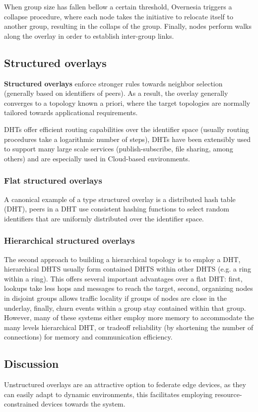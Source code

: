 When group size has fallen bellow a certain threshold, Overnesia triggers a collapse procedure, where each node takes the initiative to relocate itself to another group, resulting in the collaps of the group. Finally, nodes perform walks along the overlay in order to establish inter-group links.


\subsection{Structured overlays} 

\textbf{Structured overlays} enforce stronger rules towards neighbor selection (generally based on identifiers of peers). As a result, the overlay generally converges to a topology known a priori, where the target topologies are normally tailored towards applicational requirements. 

DHTs offer efficient routing capabilities over the identifier space (usually routing procedures take a logarithmic number of steps), DHTs have been extensibly used to support many large scale services (publish-subscribe, file sharing, among others) and are especially used in Cloud-based environments. 

\subsubsection{Flat structured overlays}

A canonical example of a type structured overlay is a distributed hash table (DHT), peers in a DHT use consistent hashing functions to select random identifiers that are uniformly distributed over the identifier space. 

\subsubsection{Hierarchical structured overlays}

The second approach to building a hierarchical topology is to employ a DHT, hierarchical DHTS usually form contained DHTS within other DHTS (e.g. a ring within a ring). This offers several important advantages over a flat DHT: first, lookups take less hops and messages to reach the target, second, organizing nodes in disjoint groups allows traffic locality if groups of nodes are close in the underlay, finally, churn events within a group stay contained within that group. However, many of these systems either employ more memory to accommodate the many levels hierarchical DHT, or tradeoff reliability (by shortening the number of connections) for memory and communication efficiency.


\subsection{Discussion}

Unstructured overlays are an attractive option to federate edge devices, as they can easily adapt to dynamic environments, this facilitates employing resource-constrained devices towards the system.